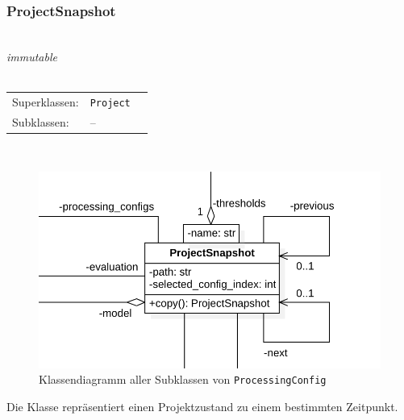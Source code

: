\documentclass{article}
\begin{document}
\subsubsection*{\large{\textbf{ProjectSnapshot}\label{cls:ProjectSnapshot}}}\\
\textit{\flqq{}immutable\frqq}\normalsize\\\\
\begin{tabular}{lll}
 Superklassen: & \texttt{Project}\\
 Subklassen: & --
\end{tabular}\\
\begin{figure}[H]%
    \centering
    \includegraphics[width=13cm]{entwurf/Entwurf_dokument/img/cls/model/ProjectSnapshot.png}
    \caption{Klassendiagramm aller Subklassen von \texttt{ProcessingConfig}}
\end{figure}

Die Klasse repräsentiert einen Projektzustand zu einem bestimmten Zeitpunkt.
\\\\
\end{document}
